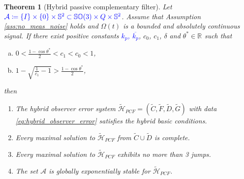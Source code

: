 \documentclass{article}
\newcommand{\SOthree}{\mathbb{SO}(3)}
\newcommand{\R}[1]{\mathbb{R}^{#1}}
\newtheorem{theorem}{Theorem}
\newcommand{\textblue}[1]{\textcolor{blue}{#1}}
\begin{document}
\begin{theorem}[Hybrid passive complementary filter]\label{theorem:main}
    Let $\textblue{\mathcal{A}\coloneqq \{I\}\times \{0\}\times \mathbb{S}^2 \subset \SOthree\times Q\times \mathbb{S}^2}$. Assume that Assumption \ref{ass:no_meas_noise} holds and $\Omega(t)$ is a bounded and absolutely continuous signal. If there exist positive constants \textblue{$k_p$, $\overline{k_p}$}, $c_0$, $c_1$, $\delta$ and  $\theta^*\in \R{}$ such that 
        \begin{enumerate}[(a)]
        \item $0 < \frac{1 - \cos\theta^*}{2} < c_1 < c_0 < 1$,\label{item:a-bullet}
        \item $1 - \sqrt{\frac{1}{c_1}-1} > \frac{1-\cos\theta^*}{2}$, \label{item:b-bullet}
        \end{enumerate}
    \begingroup
    \renewcommand\labelenumi{(\theenumi)}
    then
    \begin{enumerate}
        \item \label{(1)}The hybrid observer error system $\tilde{\mathcal{H}}_{PCF} = (\tilde{C}, \tilde{F}, \tilde{D}, \tilde{G})$ with data \eqref{eq:hybrid_observer_error} satisfies the hybrid basic conditions.
        \item \label{(2)}Every maximal solution to $\tilde{\mathcal{H}}_{PCF}$ from $\tilde{C}\cup \tilde{D}$ is complete.
        \item \label{(3)} Every maximal solution to $\tilde{\mathcal{H}}_{PCF}$ exhibits no more than 3 jumps. 
        \item \label{(4)}The set $\mathcal{A}$ is globally exponentially stable for $\tilde{\mathcal{H}}_{PCF}$. 
    \end{enumerate}
    \endgroup
    \end{theorem}
\end{document}
